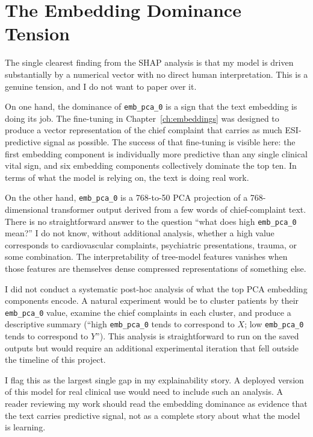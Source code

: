 \section{The Embedding Dominance Tension}

The single clearest finding from the SHAP analysis is that my model is driven substantially by a numerical vector with no direct human interpretation. This is a genuine tension, and I do not want to paper over it.

On one hand, the dominance of \texttt{emb\_pca\_0} is a sign that the text embedding is doing its job. The fine-tuning in Chapter~\ref{ch:embeddings} was designed to produce a vector representation of the chief complaint that carries as much ESI-predictive signal as possible. The success of that fine-tuning is visible here: the first embedding component is individually more predictive than any single clinical vital sign, and six embedding components collectively dominate the top ten. In terms of what the model is relying on, the text is doing real work.

On the other hand, \texttt{emb\_pca\_0} is a 768-to-50 PCA projection of a 768-dimensional transformer output derived from a few words of chief-complaint text. There is no straightforward answer to the question ``what does high \texttt{emb\_pca\_0} mean?'' I do not know, without additional analysis, whether a high value corresponds to cardiovascular complaints, psychiatric presentations, trauma, or some combination. The interpretability of tree-model features vanishes when those features are themselves dense compressed representations of something else.

\begin{notebox}
I did not conduct a systematic post-hoc analysis of what the top PCA embedding components encode. A natural experiment would be to cluster patients by their \texttt{emb\_pca\_0} value, examine the chief complaints in each cluster, and produce a descriptive summary (``high \texttt{emb\_pca\_0} tends to correspond to $X$; low \texttt{emb\_pca\_0} tends to correspond to $Y$''). This analysis is straightforward to run on the saved outputs but would require an additional experimental iteration that fell outside the timeline of this project.

I flag this as the largest single gap in my explainability story. A deployed version of this model for real clinical use would need to include such an analysis. A reader reviewing my work should read the embedding dominance as evidence that the text carries predictive signal, not as a complete story about what the model is learning.
\end{notebox}

